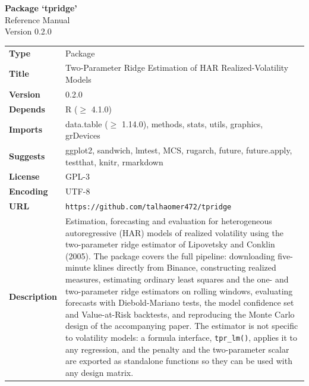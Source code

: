 \documentclass[10pt,a4paper]{report}
\begin{document}
\thispagestyle{empty}
\begin{center}
{\LARGE\bfseries Package `tpridge'}\\[10pt]
{\Large Reference Manual}\\[6pt]
{\large Version 0.2.0}
\end{center}
\vspace{18pt}

\noindent
\begin{longtable}{@{}p{} p{}@{}}
\textbf{Type} & Package \\[3pt]
\textbf{Title} & Two-Parameter Ridge Estimation of HAR Realized-Volatility Models \\[3pt]
\textbf{Version} & 0.2.0 \\[3pt]
\textbf{Depends} & R ($\geq$ 4.1.0) \\[3pt]
\textbf{Imports} & data.table ($\geq$ 1.14.0), methods, stats, utils, graphics, grDevices \\[3pt]
\textbf{Suggests} & ggplot2, sandwich, lmtest, MCS, rugarch, future, future.apply, testthat, knitr, rmarkdown \\[3pt]
\textbf{License} & GPL-3 \\[3pt]
\textbf{Encoding} & UTF-8 \\[3pt]
\textbf{URL} & \texttt{https://github.com/talhaomer472/tpridge} \\[3pt]
\textbf{Description} & Estimation, forecasting and evaluation for heterogeneous
autoregressive (HAR) models of realized volatility using the two-parameter
ridge estimator of Lipovetsky and Conklin (2005). The package covers the full
pipeline: downloading five-minute klines directly from Binance, constructing
realized measures, estimating ordinary least squares and the one- and
two-parameter ridge estimators on rolling windows, evaluating forecasts with
Diebold-Mariano tests, the model confidence set and Value-at-Risk backtests,
and reproducing the Monte Carlo design of the accompanying paper. The
estimator is not specific to volatility models: a formula interface,
\texttt{tpr\_lm()}, applies it to any regression, and the penalty and the
two-parameter scalar are exported as standalone functions so they can be used
with any design matrix. \\
\end{longtable}
\end{document}
